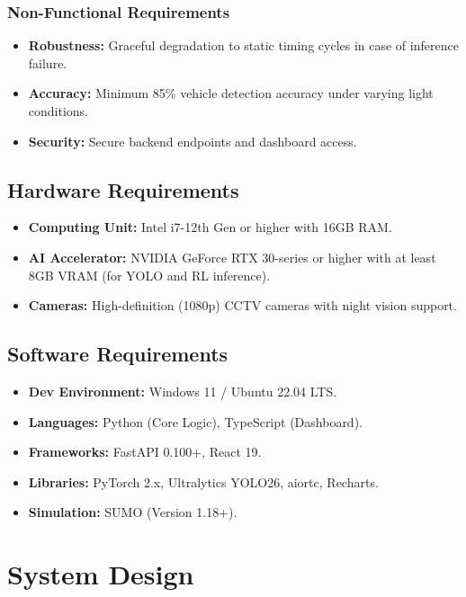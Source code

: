 \documentclass[12pt,a4paper]{report}
\begin{document}
\subsection{Non-Functional Requirements}
\begin{itemize}
    \item \textbf{Robustness:} Graceful degradation to static timing cycles in case of inference failure.
    \item \textbf{Accuracy:} Minimum 85\% vehicle detection accuracy under varying light conditions.
    \item \textbf{Security:} Secure backend endpoints and dashboard access.
\end{itemize}

\section{Hardware Requirements}
\begin{itemize}
    \item \textbf{Computing Unit:} Intel i7-12th Gen or higher with 16GB RAM.
    \item \textbf{AI Accelerator:} NVIDIA GeForce RTX 30-series or higher with at least 8GB VRAM (for YOLO and RL inference).
    \item \textbf{Cameras:} High-definition (1080p) CCTV cameras with night vision support.
\end{itemize}

\section{Software Requirements}
\begin{itemize}
    \item \textbf{Dev Environment:} Windows 11 / Ubuntu 22.04 LTS.
    \item \textbf{Languages:} Python (Core Logic), TypeScript (Dashboard).
    \item \textbf{Frameworks:} FastAPI 0.100+, React 19.
    \item \textbf{Libraries:} PyTorch 2.x, Ultralytics YOLO26, aiortc, Recharts.
    \item \textbf{Simulation:} SUMO (Version 1.18+).
\end{itemize}

\chapter{System Design}
\end{document}
